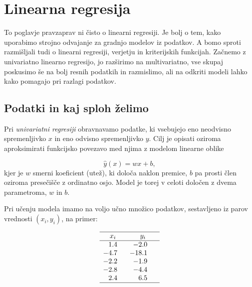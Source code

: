 \chapter{Linearna regresija}

To poglavje pravzaprav ni čisto o linearni regresiji. Je bolj o tem, kako uporabimo strojno odvajanje za gradnjo modelov iz podatkov. A bomo sproti razmišljali tudi o linearni regresiji, verjetju in kriterijskih funkcijah. Začnemo z univariatno linearno regresijo, jo razširimo na multivariatno, vse skupaj poskusimo še na bolj resnih podatkih in razmislimo, ali na odkriti modeli lahko kako pomagajo pri razlagi podatkov.

\vspace*{5mm}
\section{Podatki in kaj sploh želimo}

Pri \emph{univariatni regresiji} obravnavamo podatke, ki vsebujejo eno neodvisno spremenljivko $x$ in eno odvisno spremenljivko $y$. Cilj je opisati oziroma aproksimirati funkcijsko povezavo med njima z modelom linearne oblike

\[
\hat{y}(x) = wx + b ,
\]
%
kjer je $w$ smerni koeficient (utež), ki določa naklon premice, $b$ pa prosti člen oziroma presečišče z ordinatno osjo. Model je torej v celoti določen z dvema parametroma, $w$ in $b$.

Pri učenju modela imamo na voljo učno množico podatkov, sestavljeno iz parov vrednosti $(x_i, y_i)$, na primer:

\[
\begin{array}{S S}
\hline
{x_i} & {y_i} \\
\hline
1.4 & -2.0 \\
-4.7 & -18.1 \\
-2.2 & -1.9 \\
-2.8 & -4.4 \\
2.4 & 6.5 \\
\hline
\end{array}
\]


